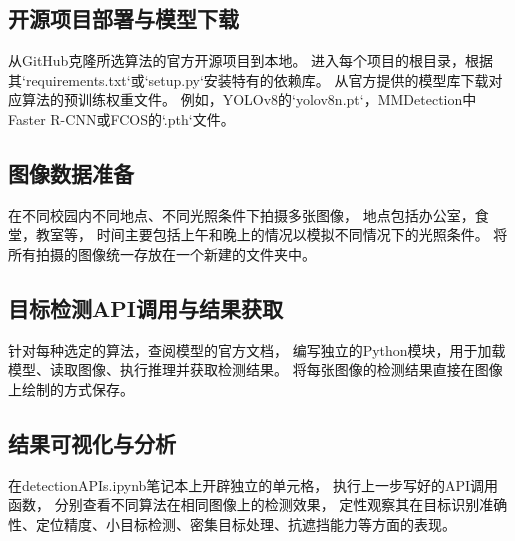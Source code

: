 \subsection{开源项目部署与模型下载}
从GitHub克隆所选算法的官方开源项目到本地。
进入每个项目的根目录，根据其`requirements.txt`或`setup.py`安装特有的依赖库。
从官方提供的模型库下载对应算法的预训练权重文件。
例如，YOLOv8的`yolov8n.pt`，MMDetection中Faster R-CNN或FCOS的`.pth`文件。

\subsection{图像数据准备}
在不同校园内不同地点、不同光照条件下拍摄多张图像，
地点包括办公室，食堂，教室等，
时间主要包括上午和晚上的情况以模拟不同情况下的光照条件。
将所有拍摄的图像统一存放在一个新建的文件夹中。

\subsection{目标检测API调用与结果获取}
针对每种选定的算法，查阅模型的官方文档，
编写独立的Python模块，用于加载模型、读取图像、执行推理并获取检测结果。
将每张图像的检测结果直接在图像上绘制的方式保存。

\subsection{结果可视化与分析}
在detectionAPIs.ipynb笔记本上开辟独立的单元格，
执行上一步写好的API调用函数，
分别查看不同算法在相同图像上的检测效果，
定性观察其在目标识别准确性、定位精度、小目标检测、密集目标处理、抗遮挡能力等方面的表现。